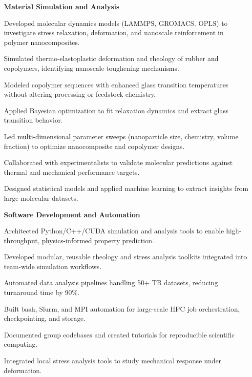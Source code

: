 \documentclass[letterpaper,12pt]{article}
\begin{document}
\textbf{Material Simulation and Analysis}
\begin{tabitemize}
    \item Developed molecular dynamics models (LAMMPS, GROMACS, OPLS) to investigate stress relaxation, deformation, and nanoscale reinforcement in polymer nanocomposites.
    \item Simulated thermo-elastoplastic deformation and rheology of rubber and copolymers, identifying nanoscale toughening mechanisms.
    \item Modeled copolymer sequences with enhanced glass transition temperatures without altering processing or feedstock chemistry.
    \item Applied Bayesian optimization to fit relaxation dynamics and extract glass transition behavior.
    \item Led multi-dimensional parameter sweeps (nanoparticle size, chemistry, volume fraction) to optimize nanocomposite and copolymer designs.
    \item Collaborated with experimentalists to validate molecular predictions against thermal and mechanical performance targets.
    \item Designed statistical models and applied machine learning to extract insights from large molecular datasets.
\end{tabitemize}

\vspace{0.5em}
\textbf{Software Development and Automation}
\begin{tabitemize}
    \item Architected Python/C++/CUDA simulation and analysis tools to enable high-throughput, physics-informed property prediction.
    \item Developed modular, reusable rheology and stress analysis toolkits integrated into team-wide simulation workflows.
    \item Automated data analysis pipelines handling 50+ TB datasets, reducing turnaround time by 90\%.
    \item Built bash, Slurm, and MPI automation for large-scale HPC job orchestration, checkpointing, and storage.
    \item Documented group codebases and created tutorials for reproducible scientific computing.
    \item Integrated local stress analysis tools to study mechanical response under deformation.
\end{tabitemize}
\end{document}
